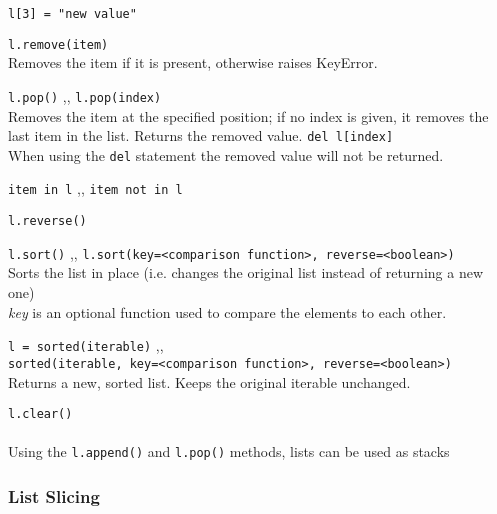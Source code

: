\begin{itemize}
       \texttt{l[3] = "new value"}

       \texttt{l.remove(item)} \\
      Removes the item if it is present, otherwise raises KeyError.

      \begin{itemize}
           \texttt{l.pop()} \sep{,}
          \texttt{l.pop(index)} \\
          Removes the item at the specified position; if no index is given, it removes the last item
          in the list. Returns the removed value.
           \texttt{del l[index]} \\
          When using the \texttt{del} statement the removed value will not be returned.
      \end{itemize}
      

       \texttt{item in l} \sep{,}
      \texttt{item not in l}

       \texttt{l.reverse()}

       \texttt{l.sort()} \sep{,}
      \texttt{l.sort(key=<comparison function>, reverse=<boolean>)} \\
      Sorts the list in place (i.e. changes the original list instead of returning a new one)\\
      \textit{key} is an optional function used to compare the elements to each other.

       \texttt{l = sorted(iterable)} \sep{,} \\
      \texttt{sorted(iterable, key=<comparison function>, reverse=<boolean>)} \\
      Returns a new, sorted list. Keeps the original iterable unchanged. 

       \texttt{l.clear()}
      \\ \\
      Using the \texttt{l.append()} and \texttt{l.pop()} methods, lists
      can be used as stacks

    \end{itemize}

    \subsubsection{List Slicing} \label{List Slicing}

